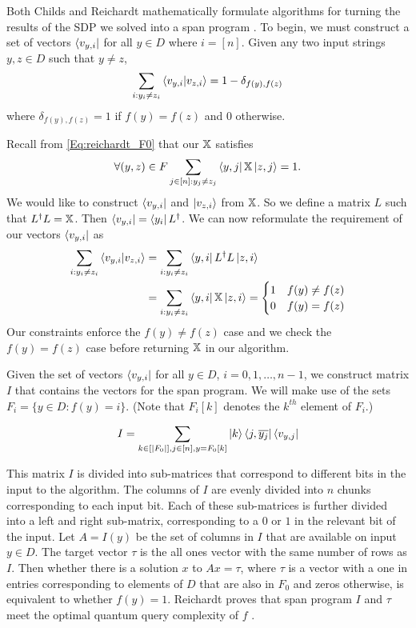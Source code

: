 Both Childs and Reichardt mathematically formulate
algorithms for turning the results of the SDP we solved
into a span program \cite{reichardt2009span, childs}.
To begin, we must construct a set of vectors
$\bra{v_{y,i}}$ for all $y \in D$ where $i = [n]$.
Given any two input strings $y, z \in D$ such that $y\neq z$,
\begin{align}
    \sum_{i: y_i \ne z_i} \braket{v_{y,i}|v_{z,i}} = 1 - \delta_{f(y), f(z)} \nonumber
\end{align}
where $\delta_{f(y), f(z)} = 1$ if $f(y) = f(z)$ and $0$ otherwise.

Recall from \cref{Eq:reichardt_F0} that our $\operatorname{\mathbb{X}}$ satisfies
\begin{align}
    \forall (y,z) \in F \sum_{j \in [n]: y_j \ne z_j} 
    \bra{y,j} \operatorname{\mathbb{X}} \ket{z, j} = 1 \nonumber.
\end{align}
We would like to construct $\bra{v_{y,i}}$ and $\ket{v_{z,i}}$
from $\operatorname{\mathbb{X}}$.
So we define a matrix $L$ such that $L^\dagger L = \operatorname{\mathbb{X}}$.
Then $\bra{v_{y,i}} = \bra{y_i}L^\dagger$.
We can now reformulate the requirement of our vectors $\bra{v_{y,i}}$
as
\begin{align}
    \sum_{i: y_i \ne z_i} \braket{v_{y,i}|v_{z,i}} &= \sum_{i: y_i \ne z_i}
    \bra{y,i} L^\dagger L \ket{z, i} \nonumber \\
    &= \sum_{i: y_i \ne z_i} \bra{y,i} \operatorname{\mathbb{X}} \ket{z, i} = \begin{cases}
        1 & f(y) \ne f(z) \\
        0 & f(y) = f(z)
    \end{cases} \nonumber 
\end{align}
Our constraints enforce the $f(y) \neq f(z)$ case and we
check the $f(y) = f(z)$ case before returning $\operatorname{\mathbb{X}}$ in our algorithm.

Given the set of vectors $\bra{v_{y,i}}$ for all $y \in
D$, $i = 0, 1, \ldots , n-1$, we construct 
matrix $I$ that contains the vectors for the span
program. We will make use of the sets $F_i =
\{y \in D: f(y) = i\}$.
(Note that $F_i[k]$ denotes the $k^{th}$ element of $F_i$.)

\begin{align}
    I = \sum_{k \in [|F_0|], j \in [n], y = F_0[k]}
    \ket{k}\bra{j, \overline{y_j}} \bra{v_{y,j}}
    \nonumber
\end{align}

This matrix $I$ is divided into sub-matrices that
correspond to different bits in the input to the
algorithm.
The columns of $I$ are evenly divided into
$n$ chunks corresponding to each input bit.
Each of these sub-matrices is further divided into a left and
right sub-matrix, corresponding to a $0$ or $1$
in the relevant bit of the input.
Let $A=I(y)$ be the set of columns in $I$ that are available
on input $y \in D$.
The target vector $\tau$ is the all ones vector with the same number
of rows as $I$.
Then whether there is a solution $x$ to $Ax = \tau$, where $\tau$ is a vector with a one in entries corresponding to elements of $D$ that are also in $F_0$ and zeros otherwise, is equivalent
to whether $f(y) = 1$.
Reichardt proves that span program $I$ and $\tau$ meet
the optimal quantum query complexity of $f$ \cite{reichardt2009span}.
